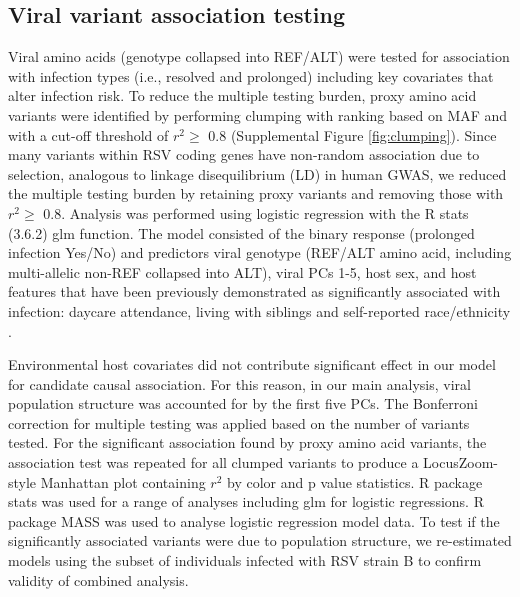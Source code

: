 \documentclass{article} %
\begin{document}
\subsection{Viral variant association testing}
Viral amino acids (genotype collapsed into REF/ALT) were tested for association with infection types (i.e., resolved and prolonged) including key covariates that alter infection risk. To reduce the multiple testing burden, proxy amino acid variants were identified by performing clumping with ranking based on MAF and with a cut-off threshold of $r^2 \ge$ 0.8 (Supplemental Figure \ref{fig:clumping}). 
Since many variants within RSV coding genes have non-random association due to selection, analogous to linkage disequilibrium (LD) in human GWAS, we reduced the multiple testing burden by retaining proxy variants and removing those with $r^2 \ge$ 0.8. 
Analysis was performed using logistic regression with the R stats (3.6.2) glm function. 
The model consisted of the binary response (prolonged infection Yes/No) and predictors viral genotype (REF/ALT amino acid, including multi-allelic non-REF collapsed into ALT), viral PCs 1-5, host sex, and host features that have been previously demonstrated as significantly associated with infection: daycare attendance, living with siblings and self-reported race/ethnicity
\citep{rosas2022upper}.

Environmental host covariates did not contribute significant effect in our model for candidate causal association. 
For this reason, in our main analysis, viral population structure was accounted for by the first five PCs. 
The Bonferroni correction for multiple testing was applied based on the number of variants tested. 
For the significant association found by proxy amino acid variants, the association test was repeated for all clumped variants to produce a LocusZoom-style Manhattan plot containing $r^2$ by color and p value statistics. 
R package stats was used for a range of analyses including glm for logistic regressions. R package MASS was used to analyse logistic regression model data. 
To test if the significantly associated variants were due to population structure, we re-estimated models using the subset of individuals infected with RSV strain B to confirm validity of combined analysis.
\end{document}
